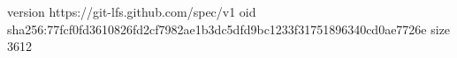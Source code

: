version https://git-lfs.github.com/spec/v1
oid sha256:77fcf0fd3610826fd2cf7982ae1b3dc5dfd9bc1233f31751896340cd0ae7726e
size 3612
